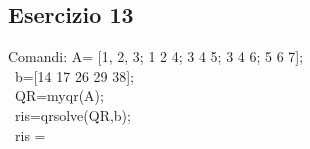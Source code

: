 \subsection{Esercizio 13}
Comandi:
A= [1, 2, 3; 1 2 4; 3 4 5; 3 4 6; 5 6 7];\\\
b=[14 17 26 29 38];\\\
QR=myqr(A);\\\
ris=qrsolve(QR,b);\\\
ris =

